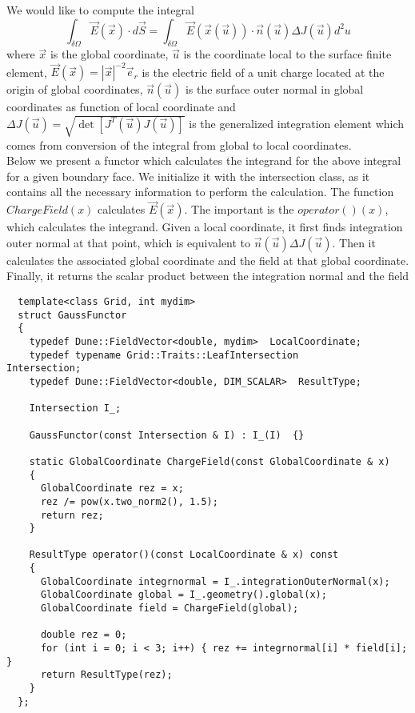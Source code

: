 \noindent
We would like to compute the integral
\[\int_{\delta \Omega} \vec{E}(\vec{x}) \cdot d\vec{S} = \int_{\delta \Omega} \vec{E}(\vec{x}(\vec{u})) \cdot \vec{n}(\vec{u}) \Delta J(\vec{u}) d^2 u \]
\noindent
where $\vec{x}$ is the global coordinate, $\vec{u}$ is the coordinate local to the surface finite element, $\vec{E}(\vec{x}) = |\vec{x}|^{-2} \vec{e}_r$ is the electric field of a unit charge located at the origin of global coordinates, $\vec{n}(\vec{u})$ is the surface outer normal in global coordinates as function of local coordinate and $\Delta J(\vec{u}) = \sqrt{\det [ J^T(\vec{u}) J(\vec{u}) ]}$ is the generalized integration element which comes from conversion of the integral from global to local coordinates. \\

\noindent
Below we present a functor which calculates the integrand for the above integral for a given boundary face. We initialize it with the intersection class, as it contains all the necessary information to perform the calculation. The function $ChargeField(x)$ calculates $\vec{E}(\vec{x})$. The important is the $operator()(x)$, which calculates the integrand. Given a local coordinate, it first finds integration outer normal at that point, which is equivalent to $\vec{n}(\vec{u}) \Delta J(\vec{u})$. Then it calculates the associated global coordinate and the field at that global coordinate. Finally, it returns the scalar product between the integration normal and the field \\


\begin{mybox}
\begin{lstlisting}
  template<class Grid, int mydim>
  struct GaussFunctor
  {
    typedef Dune::FieldVector<double, mydim>  LocalCoordinate;
    typedef typename Grid::Traits::LeafIntersection               Intersection;
    typedef Dune::FieldVector<double, DIM_SCALAR>  ResultType;

    Intersection I_;

    GaussFunctor(const Intersection & I) : I_(I)  {}

    static GlobalCoordinate ChargeField(const GlobalCoordinate & x)
    {
      GlobalCoordinate rez = x;
      rez /= pow(x.two_norm2(), 1.5);
      return rez;
    }

    ResultType operator()(const LocalCoordinate & x) const
    {
      GlobalCoordinate integrnormal = I_.integrationOuterNormal(x);
      GlobalCoordinate global = I_.geometry().global(x);
      GlobalCoordinate field = ChargeField(global);

      double rez = 0;
      for (int i = 0; i < 3; i++) { rez += integrnormal[i] * field[i]; }
      return ResultType(rez);
    }
  };
\end{lstlisting}
\end{mybox}

